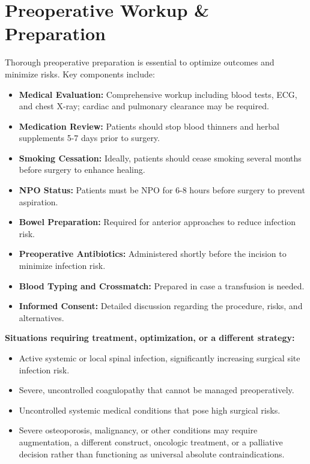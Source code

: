 \section*{Preoperative Workup \& Preparation}
Thorough preoperative preparation is essential to optimize outcomes and minimize risks. Key components include:

\begin{itemize}
  \item \textbf{Medical Evaluation:} Comprehensive workup including blood tests, ECG, and chest X-ray; cardiac and pulmonary clearance may be required.
  \item \textbf{Medication Review:} Patients should stop blood thinners and herbal supplements 5-7 days prior to surgery.
  \item \textbf{Smoking Cessation:} Ideally, patients should cease smoking several months before surgery to enhance healing.
  \item \textbf{NPO Status:} Patients must be NPO for 6-8 hours before surgery to prevent aspiration.
  \item \textbf{Bowel Preparation:} Required for anterior approaches to reduce infection risk.
  \item \textbf{Preoperative Antibiotics:} Administered shortly before the incision to minimize infection risk.
  \item \textbf{Blood Typing and Crossmatch:} Prepared in case a transfusion is needed.
  \item \textbf{Informed Consent:} Detailed discussion regarding the procedure, risks, and alternatives.
\end{itemize}

\textbf{Situations requiring treatment, optimization, or a different strategy:}
\begin{itemize}
  \item Active systemic or local spinal infection, significantly increasing surgical site infection risk.
  \item Severe, uncontrolled coagulopathy that cannot be managed preoperatively.
  \item Uncontrolled systemic medical conditions that pose high surgical risks.
  \item Severe osteoporosis, malignancy, or other conditions may require augmentation, a different construct, oncologic treatment, or a palliative decision rather than functioning as universal absolute contraindications.
\end{itemize}


